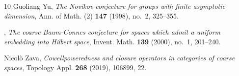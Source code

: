 \documentclass[12pt, a4paper]{amsart}
\theoremstyle{definition}
\begin{document}
\begin{thebibliography}{10}
Guoliang Yu, \emph{The {N}ovikov conjecture for groups with finite asymptotic
  dimension}, Ann. of Math. (2) \textbf{147} (1998), no.~2, 325--355.

\bysame, \emph{The coarse {B}aum-{C}onnes conjecture for spaces which admit a
  uniform embedding into {H}ilbert space}, Invent. Math. \textbf{139} (2000),
  no.~1, 201--240. 

Nicol\`o Zava, \emph{Cowellpoweredness and closure operators in categories of
  coarse spaces}, Topology Appl. \textbf{268} (2019), 106899, 22. 

\end{thebibliography}
\end{document}
